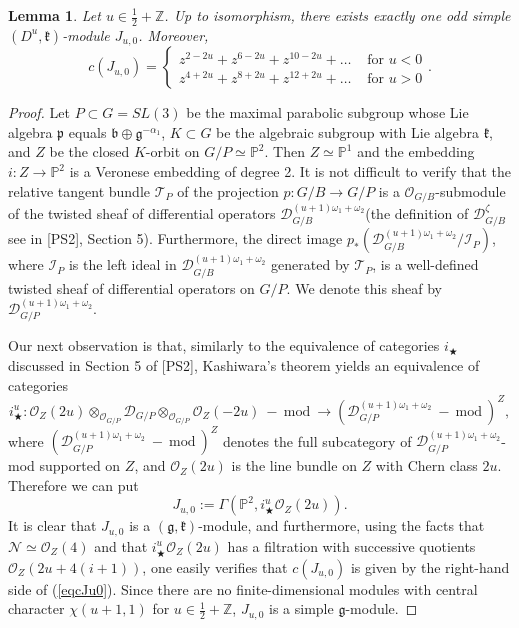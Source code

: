 \documentclass[12pt]{amsart}
\theoremstyle{plain} %
\newtheorem{lemma}[definition]{Lemma}
\newcommand {\ZZ} {\mathbb {Z}}
\newcommand {\PP} {\mathbb {P}}
\newcommand{\kk}{\mathfrak{k}}
\renewcommand{\gg}{\mathfrak{g}}
\newcommand{\bb}{\mathfrak{b}}
\newcommand{\pp}{\mathfrak{p}}
\newcommand {\DD} {\mathscr {D}}
\newcommand {\OO} {\mathscr {O}}
\renewcommand{\mod}{\mathrm{mod~}}
\newcommand{\doublebrace}[4]{\left\{\begin{array}{ll}#1 & #2 \\ #3 & #4\end{array}\right.}
\newcommand{\half}{\frac{1}{2}}
\newcommand{\refeq}[1]{(\ref{#1})}
\begin{document}
\begin{lemma}\label{le105odd} Let $u\in \frac {1}{2}+\ZZ$. Up to isomorphism, there exists exactly one odd simple $(D^u,\kk)$-module $J_{u,0}$. Moreover,
\begin{equation}\label{eqcJu0}
c(J_{u,0})=\doublebrace{z^{2-2u}+z^{6-2u}+z^{10-2u}+\dots}{\text{~for~}u<0}{z^{4+2u}+z^{8+2u}+z^{12+2u}+\dots}{\text{~for~}u>0}.
\end{equation}

\end{lemma}
\begin{proof} Let $P\subset G=SL(3)$ be the maximal parabolic subgroup whose Lie algebra $\pp$ equals $\bb\oplus\gg^{-\alpha_1}$, $K\subset G$ be the algebraic subgroup with Lie algebra $\kk$, and $Z$ be the closed $K$-orbit on $G/P\simeq\PP^2$. Then $Z\simeq \PP^1$ and the embedding $i:Z \to \PP^2$ is a Veronese embedding of degree 2. It is not difficult to verify that the relative tangent bundle $\mathcal{T}_P$ of the projection $p:G/B\to G/P$ is a $\OO_{G/B}$-submodule of the twisted sheaf of differential operators $\DD_{G/B}^{(u+1)\omega_1+\omega_2}$(the definition of $\DD_{G/B}^{\zeta}$ see in [PS2], Section 5). Furthermore, the direct image $p_*(\DD_{G/B}^{(u+1)\omega_1+\omega_2}/\mathcal{I}_P)$, where $\mathcal{I}_P$ is the left ideal in $\DD_{G/B}^{(u+1)\omega_1+\omega_2}$ generated by $\mathcal{T}_P$, is a well-defined twisted sheaf of differential operators on $G/P$. We denote this sheaf by $\DD_{G/P}^{(u+1)\omega_1+\omega_2}$.

Our next observation is that, similarly to the equivalence of categories $i_\bigstar$ discussed in Section 5 of [PS2], Kashiwara's theorem yields an equivalence of categories
\[
i_\bigstar^u:\OO_Z(2u)\otimes_{\OO_{G/P}}\DD_{G/P}\otimes_{\OO_{G/P}} \OO_Z(-2u)~-~\mod\to (\DD_{G/P}^{(u+1)\omega_1+\omega_2}~-~\mod)^Z,
\]
where $(\DD_{G/P}^{(u+1)\omega_1+\omega_2}~-~\mod)^Z$ denotes the full subcategory of $\DD_{G/P}^{(u+1)\omega_1+\omega_2}$- mod supported on $Z$, and $\OO_Z(2u)$ is the line bundle on $Z$ with Chern class $2u$. Therefore we can put
\[
J_{u,0}:=\Gamma(\PP^2,i_\bigstar^u\OO_Z(2u)).
\]
It is clear that $J_{u,0}$ is a $(\gg,\kk)$-module, and furthermore, using the facts that $\mathcal N\simeq\OO_Z(4)$ and that $i_\bigstar^u\OO_Z(2u)$ has a filtration with successive quotients $\OO_Z(2u+4(i+1))$, one easily verifies that $c({J_{u,0}})$ is given by the right-hand side of \refeq{eqcJu0}. Since there are no finite-dimensional modules with central character $\chi(u+1,1)$ for $u\in\half+\ZZ$, $J_{u,0}$ is a simple $\gg$-module.


\end{proof}
\end{document}
